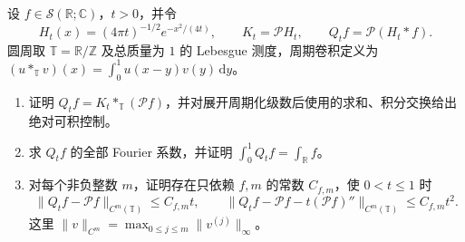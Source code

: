 \begin{exercise}\label{b2:ex:06-periodization-gaussian-commute}
设 \(f\in\mathcal S(\mathbb R;\mathbb C)\)，\(t>0\)，并令
\[
 H_t(x)=(4\pi t)^{-1/2}e^{-x^2/(4t)},\qquad
 K_t=\mathcal PH_t,\qquad
 Q_tf=\mathcal P(H_t*f).
\]
圆周取 \(\mathbb T=\mathbb R/\mathbb Z\) 及总质量为 \(1\) 的 Lebesgue 测度，周期卷积定义为 \((u*_{\mathbb T}v)(x)=\int_0^1u(x-y)v(y)\,\mathrm dy\)。
\begin{enumerate}
\item\label{b2:item:06-gaussian-commute}证明 \(Q_tf=K_t*_{\mathbb T}(\mathcal Pf)\)，并对展开周期化级数后使用的求和、积分交换给出绝对可积控制。
\item\label{b2:item:06-gaussian-coefficients}求 \(Q_tf\) 的全部 Fourier 系数，并证明 \(\int_0^1Q_tf=\int_{\mathbb R}f\)。
\item\label{b2:item:06-gaussian-approximation}对每个非负整数 \(m\)，证明存在只依赖 \(f,m\) 的常数 \(C_{f,m}\)，使 \(0<t\leq1\) 时
\[
 \|Q_tf-\mathcal Pf\|_{C^m(\mathbb T)}\leq C_{f,m}t,
 \qquad
 \|Q_tf-\mathcal Pf-t(\mathcal Pf)''\|_{C^m(\mathbb T)}
 \leq C_{f,m}t^2.
\]
这里 \(\|v\|_{C^m}=\max_{0\leq j\leq m}\|v^{(j)}\|_\infty\)。
\end{enumerate}
\end{exercise}
